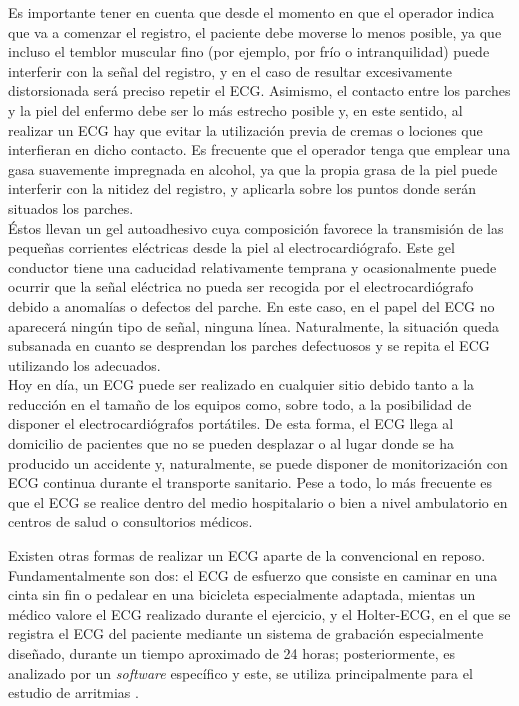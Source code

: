 \documentclass[spanish,11pt,letterpaper,oneside]{memoir}
\begin{document}
Es importante tener en cuenta que desde el momento en que el operador indica que va a comenzar el registro, el paciente debe moverse lo menos posible, ya que incluso el temblor muscular fino (por ejemplo, por frío o intranquilidad) puede interferir con la señal del registro, y en el caso de resultar excesivamente distorsionada será preciso repetir el ECG. Asimismo, el contacto entre los parches y la piel del enfermo debe ser lo más estrecho posible y, en este sentido, al realizar un ECG hay que evitar la utilización previa de cremas o lociones que interfieran en dicho contacto. Es frecuente que el operador tenga que emplear una gasa suavemente impregnada en alcohol, ya que la propia grasa de la piel puede interferir con la nitidez del registro, y aplicarla sobre los puntos donde serán situados los parches.\\ Éstos llevan un gel autoadhesivo cuya composición favorece la transmisión de las pequeñas corrientes eléctricas desde la piel al electrocardiógrafo. Este gel conductor tiene una caducidad relativamente temprana y ocasionalmente puede ocurrir que la señal eléctrica no pueda ser recogida por el electrocardiógrafo debido a anomalías o defectos del parche. En este caso, en el papel del ECG no aparecerá ningún tipo de señal, ninguna línea. Naturalmente, la situación queda subsanada en cuanto se desprendan los parches defectuosos y se repita el ECG utilizando los adecuados. \\
Hoy en día, un ECG puede ser realizado en cualquier sitio debido tanto a la reducción en el tamaño de los equipos como, sobre todo, a la posibilidad de disponer el electrocardiógrafos portátiles. De esta forma, el ECG llega al domicilio de pacientes que no se pueden desplazar o al lugar donde se ha producido un accidente y, naturalmente, se puede disponer de monitorización con ECG continua durante el transporte sanitario. Pese a todo, lo más frecuente es que el ECG se realice dentro del medio hospitalario o bien a nivel ambulatorio en centros de salud o consultorios médicos.

Existen otras formas de realizar un ECG aparte de la convencional en reposo. Fundamentalmente son dos: el ECG de esfuerzo que consiste en caminar en una cinta sin fin o pedalear en una bicicleta especialmente adaptada, mientas un médico valore el ECG realizado durante el ejercicio, y el Holter-ECG, en el que se registra el ECG del paciente mediante un sistema de grabación especialmente diseñado, durante un tiempo aproximado de 24 horas; posteriormente, es analizado por un \textit{software} específico y este, se utiliza principalmente para el estudio de arritmias \cite{textCardi}. 
\end{document}
